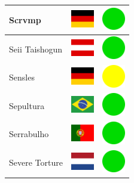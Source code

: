 \documentclass[12pt, a4paper, twoside]{report}
\begin{document}
\begin{center}
\begin{longtable}{|p{5cm}|p{2cm}|p{2cm}|}
Scrvmp & \includegraphics[width=1cm]{4x3/de} & \includegraphics[width=1cm]{likes/y} \\ \hline
Seii Taishogun & \includegraphics[width=1cm]{4x3/at} & \includegraphics[width=1cm]{likes/y} \\ \hline
Sensles & \includegraphics[width=1cm]{4x3/de} & \includegraphics[width=1cm]{likes/m} \\ \hline
Sepultura & \includegraphics[width=1cm]{4x3/br} & \includegraphics[width=1cm]{likes/y} \\ \hline
Serrabulho & \includegraphics[width=1cm]{4x3/pt} & \includegraphics[width=1cm]{likes/y} \\ \hline
Severe Torture & \includegraphics[width=1cm]{4x3/nl} & \includegraphics[width=1cm]{likes/y} \\ \hline

\end{longtable}
\end{center}
\end{document}
